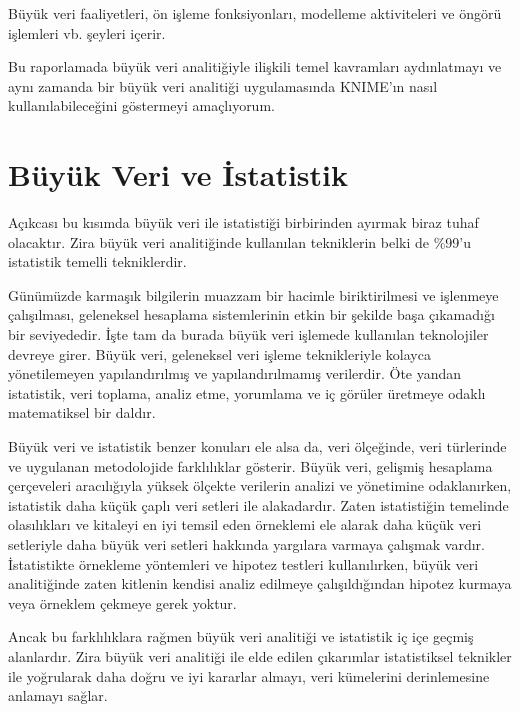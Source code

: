 \documentclass{article}
\begin{document}
\vspace{5pt}
Büyük veri faaliyetleri, ön işleme fonksiyonları, modelleme aktiviteleri ve öngörü işlemleri vb. şeyleri içerir. 

\vspace{5pt}
Bu raporlamada büyük veri analitiğiyle ilişkili temel kavramları aydınlatmayı ve aynı zamanda bir büyük veri analitiği uygulamasında KNIME'ın nasıl kullanılabileceğini göstermeyi amaçlıyorum.

\clearpage
\section{Büyük Veri ve İstatistik}
Açıkcası bu kısımda büyük veri ile istatistiği birbirinden ayırmak biraz tuhaf olacaktır. Zira büyük veri analitiğinde kullanılan tekniklerin belki de \%99'u istatistik temelli tekniklerdir.

\vspace{5pt}
Günümüzde karmaşık bilgilerin muazzam bir hacimle biriktirilmesi ve işlenmeye çalışılması, geleneksel hesaplama sistemlerinin etkin bir şekilde başa çıkamadığı bir seviyededir. İşte tam da burada büyük veri işlemede kullanılan teknolojiler devreye girer. Büyük veri, geleneksel veri işleme teknikleriyle kolayca yönetilemeyen yapılandırılmış ve yapılandırılmamış verilerdir. Öte yandan istatistik, veri toplama, analiz etme, yorumlama ve iç görüler üretmeye odaklı matematiksel bir daldır. 

\vspace{5pt}
Büyük veri ve istatistik benzer konuları ele alsa da, veri ölçeğinde, veri türlerinde ve uygulanan metodolojide farklılıklar gösterir. Büyük veri, gelişmiş hesaplama çerçeveleri aracılığıyla yüksek ölçekte verilerin analizi ve yönetimine odaklanırken, istatistik daha küçük çaplı veri setleri ile alakadardır. Zaten istatistiğin temelinde olasılıkları ve kitaleyi en iyi temsil eden örneklemi ele alarak daha küçük veri setleriyle daha büyük veri setleri hakkında yargılara varmaya çalışmak vardır. İstatistikte örnekleme yöntemleri ve hipotez testleri kullanılırken, büyük veri analitiğinde zaten kitlenin kendisi analiz edilmeye çalışıldığından hipotez kurmaya veya örneklem çekmeye gerek yoktur. 

\vspace{5pt}
Ancak bu farklılıklara rağmen büyük veri analitiği ve istatistik iç içe geçmiş alanlardır. Zira büyük veri analitiği ile elde edilen çıkarımlar istatistiksel teknikler ile yoğrularak daha doğru ve iyi kararlar almayı, veri kümelerini derinlemesine anlamayı sağlar.
\end{document}
